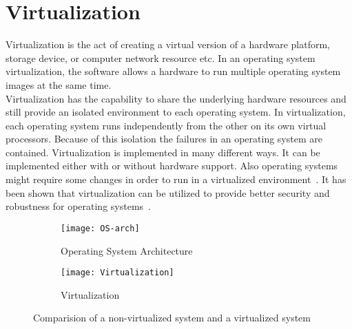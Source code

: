 \section{Virtualization}
Virtualization is the act of creating a virtual version of a hardware platform, storage device, or computer network resource etc. In an operating system virtualization, the software allows a hardware to run multiple operating system images at the same time.
\\[3mm]
Virtualization has the capability to share the underlying hardware resources and still provide an isolated environment to each operating system. In virtualization, each operating system runs independently from the other on its own virtual processors. Because of this isolation the failures in an operating system are contained. Virtualization is implemented in many different ways. It can be implemented either with or without hardware support. Also operating systems might require some changes in order to run in a virtualized environment~\cite{Drepper:2008:CV:1348583.1348591}. It has been shown that virtualization can be utilized to provide better security and robustness for operating systems~\cite{Fraser04safehardware, LeVasseur04UnmodifiedDriverReuse, Riley:2008:GPK:1433006.1433008}.
\begin{figure}[!ht]
    \centering
    \begin{subfigure}[b]{0.49\textwidth}
	\texttt{[image: OS-arch]}
	\caption{Operating System Architecture}
	\label{fig:OS}
    \end{subfigure}
	\hfill
    \begin{subfigure}[b]{0.49\textwidth}
	\texttt{[image: Virtualization]}
	\caption{Virtualization}
	\label{fig:Virtualization}
	\end{subfigure}
    \caption{Comparision of a non-virtualized system and a virtualized system}\label{fig:Kernel space}
\end{figure}

